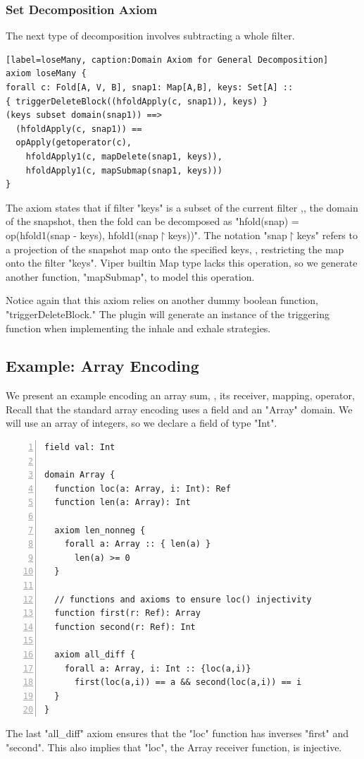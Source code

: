 \documentclass[msc,oneside]{ubcthesis}
\theoremstyle{definition}
\begin{document}
\subsubsection{Set Decomposition Axiom}
The next type of decomposition involves subtracting a whole filter.
\begin{lstlisting}[label=loseMany, caption:Domain Axiom for General Decomposition]
axiom loseMany {
forall c: Fold[A, V, B], snap1: Map[A,B], keys: Set[A] ::
{ triggerDeleteBlock((hfoldApply(c, snap1)), keys) }
(keys subset domain(snap1)) ==>
  (hfoldApply(c, snap1)) ==
  opApply(getoperator(c), 
    hfoldApply1(c, mapDelete(snap1, keys)),
    hfoldApply1(c, mapSubmap(snap1, keys)))
}
\end{lstlisting}
The axiom states that if filter "keys" is a subset of the current filter ,\ie, the domain of the snapshot, then the fold can be decomposed as "hfold(snap) = op(hfold1(snap - keys), hfold1(snap$\upharpoonright$keys))". The notation "snap$\upharpoonright$keys" refers to a projection of the snapshot map onto the specified keys, \ie, restricting the map onto the filter "keys". Viper builtin Map type lacks this operation, so we generate another function, "mapSubmap", to model this operation. 

Notice again that this axiom relies on another dummy boolean function, "triggerDeleteBlock." The plugin will generate an instance of the triggering function when implementing the inhale and exhale strategies. 

\subsection{Example: Array Encoding}
We present an example encoding an array sum, \ie, its receiver, mapping, operator, \etc Recall that the standard array encoding uses a field and an "Array" domain. We will use an array of integers, so we declare a field of type "Int".
\begin{lstlisting}[language=silver,numbers=left, firstnumber=1, stepnumber=1]
field val: Int

domain Array {
  function loc(a: Array, i: Int): Ref
  function len(a: Array): Int

  axiom len_nonneg {
    forall a: Array :: { len(a) }
      len(a) >= 0
  }

  // functions and axioms to ensure loc() injectivity
  function first(r: Ref): Array
  function second(r: Ref): Int  

  axiom all_diff {
    forall a: Array, i: Int :: {loc(a,i)}
      first(loc(a,i)) == a && second(loc(a,i)) == i
  }
}
\end{lstlisting}
The last "all_diff" axiom ensures that the "loc" function has inverses "first" and "second". This also implies that "loc", the Array receiver function, is injective. 
\end{document}
